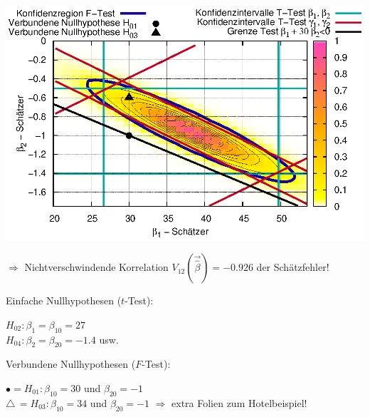\documentclass[a4paper]{foils}
\begin{document}
\begin{landscape}
\begin{center}
\newpage
\vspace{-0.3em}
\hspace{-0.15\textwidth}
\includegraphics[width=1.1\textwidth]{figsRegr/hotel_f2_hatbeta1_hatbeta2.eps}
\vspace{-1em}

{\scriptsize
$\Rightarrow$ Nichtverschwindende Korrelation $V_{12}(\vec{\hat{\beta}})=-0.926$ 
der Sch\"atzfehler!

Einfache Nullhypothesen ($t$-Test): 
\hspace{0.1\textwidth}
\parbox{0.6\textwidth}{
$H_{02}: \beta_1=\beta_{10}=27$ \\
$H_{04}: \beta_2=\beta_{20}=-1.4$ usw. 
}

Verbundene Nullhypothesen ($F$-Test):
\hspace{0.1\textwidth}
\parbox{0.9\textwidth}{
 $\bullet=H_{01}: \beta_{10}=30$ und $\beta_{20}=-1$\\
 {\scriptsize $\triangle$}\,$=H_{03}: \beta_{10}=34$ und
 $\beta_{20}=-1$ \hspace{3em} $\Rightarrow$ extra Folien zum Hotelbeispiel!
}
}



\newpage


\newpage




\end{center}
\end{landscape}
\end{document}
